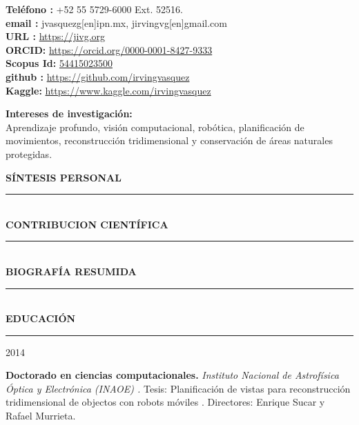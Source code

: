 \documentclass[10pt]{article}
\begin{document}
\begin{center}
\begin{minipage}[b]{0.65\linewidth}
\textbf{Teléfono \faPhone:} +52 55 5729-6000 Ext. 52516. \\
\textbf{email \faEnvelopeO:} jvasquezg[en]ipn.mx, jirvingvg[en]gmail.com\\
\textbf{URL \faExternalLink:} \url{https://jivg.org} \\
\textbf{ORCID:} \url{https://orcid.org/0000-0001-8427-9333}\\
\textbf{Scopus Id:} \href{https://www.scopus.com/authid/detail.uri?authorId=54415023500}{54415023500}\\
\textbf{github \faGithub :} \url{https://github.com/irvingvasquez} \\
\textbf{Kaggle:} \url{https://www.kaggle.com/irvingvasquez}\\
\end{minipage}

\end{center}

\begin{center}
{\bf Intereses de investigación:} \\ Aprendizaje profundo, visión computacional, robótica, planificación de movimientos, reconstrucción tridimensional y conservación de áreas naturales protegidas. 
\end{center}

{\bf SÍNTESIS PERSONAL}
\vspace{3pt}
\hrule

 \\

{\bf CONTRIBUCION CIENTÍFICA} 
\vspace{3pt}
\hrule

 \\

{\bf BIOGRAFÍA RESUMIDA}
\vspace{3pt}
\hrule

 \\
	
{\bf EDUCACIÓN}
\vspace{3pt}
\hrule

\begin{minipage}{1.5 in}
	2014\\
\end{minipage}
\begin{minipage}{4.5in}
	\textbf{Doctorado en ciencias computacionales.} \textit{Instituto Nacional de Astrofísica Óptica y Electrónica (INAOE) \href{https://www.inaoep.mx/}{\faExternalLink}.} Tesis: Planificación de vistas para reconstrucción tridimensional de objectos con robots móviles \href{https://jivasquez.files.wordpress.com/2015/03/tesis-doctorado.pdf}{\faFilePdfO}. Directores: Enrique Sucar y Rafael Murrieta.\\ 
\end{minipage}
\end{document}

